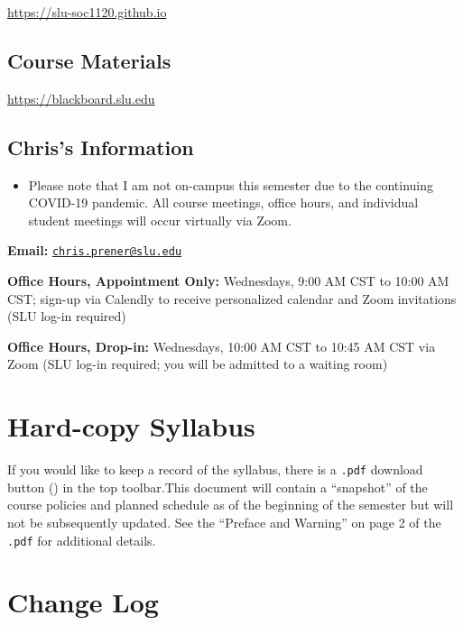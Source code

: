 \documentclass[
]{book}
\newenvironment{rmdblock}[1]
  {\begin{shaded*}
  \begin{itemize}
  \renewcommand{\labelitemi}{
    \raisebox{-.7\height}[0pt][0pt]{
      {\setkeys{Gin}{width=3em,keepaspectratio}\texttt{[image: images/\#1]}}
    }
  }
  \item
  }
  {
  \end{itemize}
  \end{shaded*}
  }
\newenvironment{rmdwarning}
  {\begin{rmdblock}{warning}}
  {\end{rmdblock}}
\begin{document}
\url{https://slu-soc1120.github.io}

\hypertarget{course-materials}{%
\subsection*{Course Materials}\label{course-materials}}

\url{https://blackboard.slu.edu}

\hypertarget{chriss-information}{%
\subsection*{Chris's Information}\label{chriss-information}}

\begin{rmdwarning}
Please note that I am not on-campus this semester due to the continuing
COVID-19 pandemic. All course meetings, office hours, and individual
student meetings will occur virtually via Zoom.
\end{rmdwarning}

\textbf{Email:} \href{mailto:chris.prener@slu.edu}{\nolinkurl{chris.prener@slu.edu}}

\textbf{Office Hours, Appointment Only:} Wednesdays, 9:00 AM CST to 10:00 AM CST; sign-up via Calendly to receive personalized calendar and Zoom invitations (SLU log-in required)

\textbf{Office Hours, Drop-in:} Wednesdays, 10:00 AM CST to 10:45 AM CST via Zoom (SLU log-in required; you will be admitted to a waiting room)

\hypertarget{hard-copy-syllabus}{%
\section*{Hard-copy Syllabus}\label{hard-copy-syllabus}}

If you would like to keep a record of the syllabus, there is a \texttt{.pdf} download button () in the top toolbar.This document will contain a ``snapshot'' of the course policies and planned schedule as of the beginning of the semester but will not be subsequently updated. See the ``Preface and Warning'' on page 2 of the \texttt{.pdf} for additional details.

\hypertarget{change-log}{%
\section*{Change Log}\label{change-log}}
\end{document}
